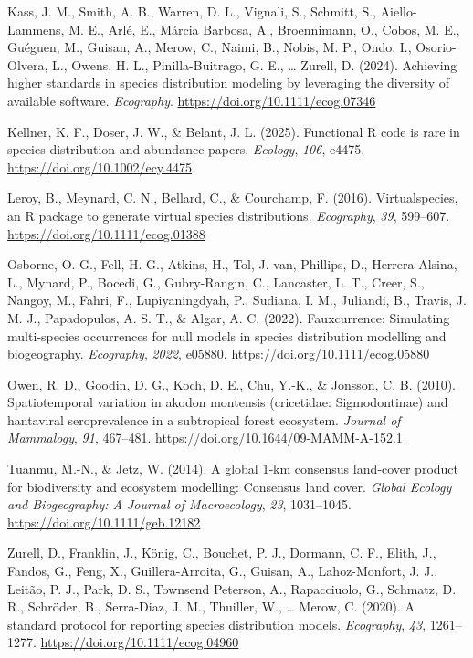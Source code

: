 \documentclass[
]{article}
\newlength{\cslhangindent}
\newenvironment{CSLReferences}[2] %
 {\begin{list}{}{%
  \setlength{\itemindent}{0pt}
  \setlength{\leftmargin}{0pt}
  \setlength{\parsep}{0pt}
  \ifodd #1
   \setlength{\leftmargin}{\cslhangindent}
   \setlength{\itemindent}{-1\cslhangindent}
  \fi
  \setlength{\itemsep}{#2\baselineskip}}}
 {\end{list}}
\begin{document}
\begin{CSLReferences}{1}{0}
Kass, J. M., Smith, A. B., Warren, D. L., Vignali, S., Schmitt, S.,
Aiello-Lammens, M. E., Arlé, E., Márcia Barbosa, A., Broennimann, O.,
Cobos, M. E., Guéguen, M., Guisan, A., Merow, C., Naimi, B., Nobis, M.
P., Ondo, I., Osorio-Olvera, L., Owens, H. L., Pinilla-Buitrago, G. E.,
\ldots{} Zurell, D. (2024). Achieving higher standards in species
distribution modeling by leveraging the diversity of available software.
\emph{Ecography}. \url{https://doi.org/10.1111/ecog.07346}

Kellner, K. F., Doser, J. W., \& Belant, J. L. (2025). Functional {R}
code is rare in species distribution and abundance papers.
\emph{Ecology}, \emph{106}, e4475.
\url{https://doi.org/10.1002/ecy.4475}

Leroy, B., Meynard, C. N., Bellard, C., \& Courchamp, F. (2016).
Virtualspecies, an {R} package to generate virtual species
distributions. \emph{Ecography}, \emph{39}, 599--607.
\url{https://doi.org/10.1111/ecog.01388}

Osborne, O. G., Fell, H. G., Atkins, H., Tol, J. van, Phillips, D.,
Herrera-Alsina, L., Mynard, P., Bocedi, G., Gubry-Rangin, C., Lancaster,
L. T., Creer, S., Nangoy, M., Fahri, F., Lupiyaningdyah, P., Sudiana, I.
M., Juliandi, B., Travis, J. M. J., Papadopulos, A. S. T., \& Algar, A.
C. (2022). Fauxcurrence: Simulating multi‐species occurrences for null
models in species distribution modelling and biogeography.
\emph{Ecography}, \emph{2022}, e05880.
\url{https://doi.org/10.1111/ecog.05880}

Owen, R. D., Goodin, D. G., Koch, D. E., Chu, Y.-K., \& Jonsson, C. B.
(2010). Spatiotemporal variation in akodon montensis (cricetidae:
Sigmodontinae) and hantaviral seroprevalence in a subtropical forest
ecosystem. \emph{Journal of Mammalogy}, \emph{91}, 467--481.
\url{https://doi.org/10.1644/09-MAMM-A-152.1}

Tuanmu, M.-N., \& Jetz, W. (2014). A global 1‐km consensus land‐cover
product for biodiversity and ecosystem modelling: Consensus land cover.
\emph{Global Ecology and Biogeography: A Journal of Macroecology},
\emph{23}, 1031--1045. \url{https://doi.org/10.1111/geb.12182}

Zurell, D., Franklin, J., König, C., Bouchet, P. J., Dormann, C. F.,
Elith, J., Fandos, G., Feng, X., Guillera-Arroita, G., Guisan, A.,
Lahoz-Monfort, J. J., Leitão, P. J., Park, D. S., Townsend Peterson, A.,
Rapacciuolo, G., Schmatz, D. R., Schröder, B., Serra-Diaz, J. M.,
Thuiller, W., \ldots{} Merow, C. (2020). A standard protocol for
reporting species distribution models. \emph{Ecography}, \emph{43},
1261--1277. \url{https://doi.org/10.1111/ecog.04960}

\end{CSLReferences}
\end{document}
